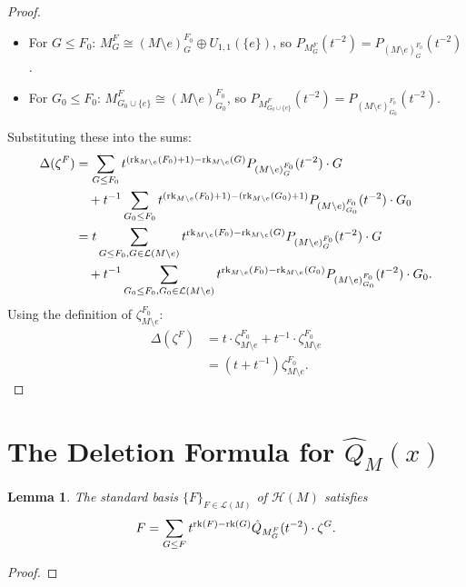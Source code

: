 \documentclass[10pt]{article}
\newcommand{\calL}{\mathcal{L}}
\newcommand{\calH}{\mathcal{H}}
\newcommand{\rank}{\normalfont\text{rk}}
\newtheorem{lemma}[theorem]{Lemma}
\theoremstyle{remark}
\begin{document}
\begin{proof}
\begin{itemize}
    \item For $G \leq F_0$: $M_G^F \cong (M\setminus e)_G^{F_0} \oplus U_{1,1}(\{e\})$, so $P_{M_G^F}(t^{-2}) = P_{(M\setminus e)_G^{F_0}}(t^{-2})$.
    \item For $G_0 \leq F_0$: $M_{G_0 \cup \{e\}}^{F} \cong (M\setminus e)_{G_0}^{F_0}$, so $P_{M_{G_0 \cup \{e\}}^{F}}(t^{-2}) = P_{(M\setminus e)_{G_0}^{F_0}}(t^{-2})$.
\end{itemize}
Substituting these into the sums:
\begin{align*}
\Delta(\zeta^F) &= \sum_{G \leq F_0} t^{(\rank_{M\setminus e}(F_0) + 1) - \rank_{M\setminus e}(G)} P_{(M\setminus e)_G^{F_0}}(t^{-2}) \cdot G \\
&\quad + t^{-1} \sum_{G_0 \leq F_0} t^{(\rank_{M\setminus e}(F_0) + 1) - (\rank_{M\setminus e}(G_0) + 1)} P_{(M\setminus e)_{G_0}^{F_0}}(t^{-2}) \cdot G_0 \\
&= t \sum_{G \leq F_0, G \in \calL(M\setminus e)} t^{\rank_{M\setminus e}(F_0) - \rank_{M\setminus e}(G)} P_{(M\setminus e)_G^{F_0}}(t^{-2}) \cdot G \\
&\quad + t^{-1} \sum_{G_0 \leq F_0, G_0 \in \calL(M\setminus e)} t^{\rank_{M\setminus e}(F_0) - \rank_{M\setminus e}(G_0)} P_{(M\setminus e)_{G_0}^{F_0}}(t^{-2}) \cdot G_0.
\end{align*}
Using the definition of $\zeta^{F_0}_{M\setminus e}$:
\begin{align*}
\Delta(\zeta^F) &= t \cdot \zeta^{F_0}_{M\setminus e} + t^{-1} \cdot \zeta^{F_0}_{M\setminus e} \\
&= (t + t^{-1})\zeta^{F_0}_{M\setminus e}.
\end{align*}
\end{proof}

\section{The Deletion Formula for $\hat{Q}_M(x)$}
\label{sec:deletion_formula}

\begin{lemma}
\label{lem:standard_basis_in_zeta}
    The standard basis $\{F\}_{F \in \calL(M)}$ of $\calH(M)$ satisfies
    \begin{equation}
    \label{cob-lemma}
        F = \sum_{G \leq F} t^{\rank(F) - \rank(G)} \hat{Q}_{M_G^F}(t^{-2}) \cdot \zeta^G.
    \end{equation}
\end{lemma}
\begin{proof}
    \lipsum[1]
\end{proof}
\end{document}
